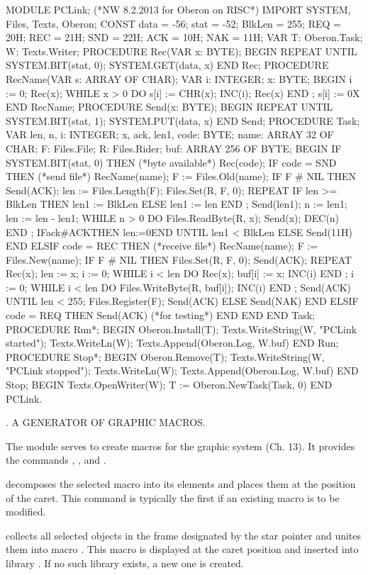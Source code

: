 MODULE PCLink; (*NW 8.2.2013 for Oberon on RISC*) IMPORT SYSTEM, Files, Texts, Oberon;
CONST data = -56; stat = -52;
BlkLen = 255;
REQ = 20H; REC = 21H; SND = 22H; ACK = 10H; NAK = 11H;
VAR T: Oberon.Task; W: Texts.Writer; PROCEDURE Rec(VAR x: BYTE); BEGIN
REPEAT UNTIL SYSTEM.BIT(stat, 0);
SYSTEM.GET(data, x) END Rec;
PROCEDURE RecName(VAR s: ARRAY OF CHAR); VAR i: INTEGER; x: BYTE;
BEGIN i := 0; Rec(x);
WHILE x > 0 DO s[i] := CHR(x); INC(i); Rec(x) END ; s[i] := 0X
END RecName;
PROCEDURE Send(x: BYTE); BEGIN
REPEAT UNTIL SYSTEM.BIT(stat, 1);
SYSTEM.PUT(data, x) END Send;
PROCEDURE Task;
VAR len, n, i: INTEGER;
x, ack, len1, code: BYTE; name: ARRAY 32 OF CHAR; F: Files.File; R: Files.Rider; buf: ARRAY 256 OF BYTE;
BEGIN
IF SYSTEM.BIT(stat, 0) THEN (*byte available*)
Rec(code);
IF code = SND THEN (*send file*)
RecName(name); F := Files.Old(name); IF F # NIL THEN
Send(ACK); len := Files.Length(F); Files.Set(R, F, 0); REPEAT
IF len >= BlkLen THEN len1 := BlkLen ELSE len1 := len END ; Send(len1); n := len1; len := len - len1;
WHILE n > 0 DO Files.ReadByte(R, x); Send(x); DEC(n) END ; IFack#ACKTHEN len:=0END
UNTIL len1 < BlkLen ELSE Send(11H)
END
ELSIF code = REC THEN (*receive file*) RecName(name); F := Files.New(name); IF F # NIL THEN
Files.Set(R, F, 0); Send(ACK); REPEAT Rec(x); len := x; i := 0;
WHILE i < len DO Rec(x); buf[i] := x; INC(i) END ;
i := 0;
WHILE i < len DO Files.WriteByte(R, buf[i]); INC(i) END ; Send(ACK)
UNTIL len < 255;
Files.Register(F); Send(ACK) ELSE Send(NAK)
END
ELSIF code = REQ THEN Send(ACK) (*for testing*)
END END
END Task;
PROCEDURE Run*;
BEGIN Oberon.Install(T); Texts.WriteString(W, "PCLink started");
Texts.WriteLn(W); Texts.Append(Oberon.Log, W.buf) END Run;
PROCEDURE Stop*;
BEGIN Oberon.Remove(T); Texts.WriteString(W, "PCLink stopped"); Texts.WriteLn(W); Texts.Append(Oberon.Log, W.buf)
END Stop;
BEGIN Texts.OpenWriter(W); T := Oberon.NewTask(Task, 0) END PCLink.
\endtt

. A GENERATOR OF GRAPHIC MACROS.

The module  serves to create macros for the graphic system (Ch. 13). It provides the commands , ,  and .

 decomposes the selected macro into its elements and places them at the position of the caret. This command is typically the first if an existing macro is to be modified.

 collects all selected objects in the frame designated by the star pointer and unites them into macro . This macro is displayed at the caret position and inserted into library . If no such library exists, a new one is created.

